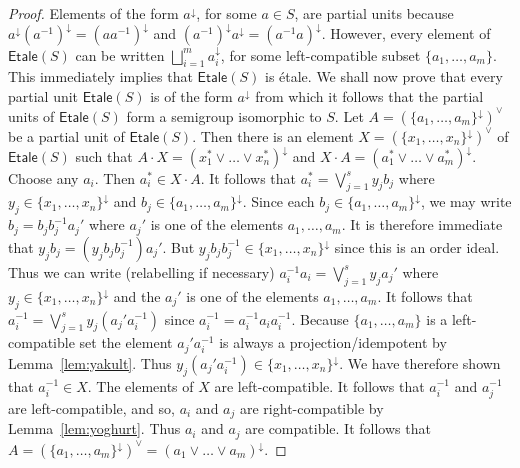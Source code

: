 \documentclass[a4paper]{amsart}
\begin{document}
\begin{proof}
Elements of the form $a^{\downarrow}$, for some $a \in S$, are partial units
because 
$a^{\downarrow}(a^{-1})^{\downarrow} = (aa^{-1})^{\downarrow}$ 
and
$(a^{-1})^{\downarrow}a^{\downarrow} = (a^{-1}a)^{\downarrow}$.
However,  every element of $\mathsf{Etale}(S)$ can be written $\bigsqcup_{i=1}^{m} a_{i}^{\downarrow}$,
for some left-compatible subset $\{a_{1},\ldots, a_{m}\}$.
This immediately implies that $\mathsf{Etale}(S)$ is \'etale.
We shall now prove that every partial unit  $\mathsf{Etale}(S)$
is of the form  $a^{\downarrow}$ from which it follows that the partial units of 
$\mathsf{Etale}(S)$ form a semigroup isomorphic to $S$.
Let $A = (\{a_{1},\ldots, a_{m}\}^{\downarrow})^{\vee}$ be a partial unit of $\mathsf{Etale}(S)$.
Then there is an element  
$X = (\{x_{1},\ldots, x_{n}\}^{\downarrow})^{\vee}$ of $\mathsf{Etale}(S)$
such that $A \cdot X = (x_{1}^{\ast} \vee \ldots \vee x_{n}^{\ast})^{\downarrow}$ 
and
$X \cdot A = (a_{1}^{\ast} \vee \ldots \vee a_{m}^{\ast})^{\downarrow}$.
Choose any $a_{i}$.
Then $a_{i}^{\ast} \in X \cdot A$.
It follows that $a_{i}^{\ast} = \bigvee_{j=1}^{s}y_{j}b_{j}$
where $y_{j} \in \{x_{1},\ldots, x_{n}\}^{\downarrow}$
and $b_{j} \in \{a_{1},\ldots, a_{m}\}^{\downarrow}$.
Since each  $b_{j} \in \{a_{1},\ldots, a_{m}\}^{\downarrow}$, we may write $b_{j} = b_{j}b_{j}^{-1}a_{j}'$
where $a_{j}'$ is one of the elements $a_{1},\ldots, a_{m}$.
It is therefore immediate that $y_{j}b_{j} = (y_{j}b_{j}b_{j}^{-1})a_{j}'$.
But $y_{j}b_{j}b_{j}^{-1} \in \{x_{1},\ldots, x_{n}\}^{\downarrow}$ since this is an order ideal.
Thus we can write (relabelling if necessary)
$a_{i}^{-1}a_{i} = \bigvee_{j=1}^{s} y_{j}a_{j}'$
where $y_{j} \in  \{x_{1},\ldots, x_{n}\}^{\downarrow}$ 
and the $a_{j}'$ is one of the elements $a_{1},\ldots, a_{m}$.
It follows that
$a_{i}^{-1} =  \bigvee_{j=1}^{s} y_{j}(a_{j}'a_{i}^{-1})$
since $a_{i}^{-1} = a_{i}^{-1}a_{i}a_{i}^{-1}$.
Because $\{a_{1},\ldots, a_{m}\}$ is a left-compatible set
the element
$a_{j}'a_{i}^{-1}$ is always a projection/idempotent by Lemma~\ref{lem:yakult}.
Thus  $y_{j}(a_{j}'a_{i}^{-1}) \in \{x_{1},\ldots, x_{n}\}^{\downarrow}$.
We have therefore shown that $a_{i}^{-1} \in X$.
The elements of $X$ are left-compatible.
It follows that $a_{i}^{-1}$ and $a_{j}^{-1}$ are left-compatible,
and so, $a_{i}$ and $a_{j}$ are right-compatible by Lemma~\ref{lem:yoghurt}.
Thus $a_{i}$ and $a_{j}$ are compatible.
It follows that $A = (\{a_{1},\ldots, a_{m}\}^{\downarrow})^{\vee} = (a_{1} \vee \ldots \vee a_{m})^{\downarrow}$.
\end{proof}
\end{document}
